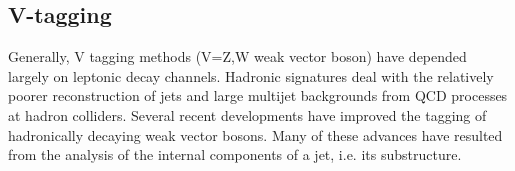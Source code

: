\subsection{V-tagging}

Generally, V tagging methods (V=Z,W weak vector boson) have depended largely on leptonic decay channels. Hadronic signatures deal with the relatively poorer reconstruction of jets and large multijet backgrounds from QCD processes at hadron colliders. Several recent developments have improved the tagging of hadronically decaying weak vector bosons. Many of these advances have resulted from the analysis of the internal components
of a jet, i.e. its substructure.

